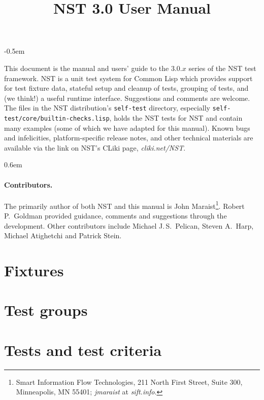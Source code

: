 \documentclass{article}
\title{NST 3.0 User Manual}
\begin{document}
\maketitle
\thispagestyle{empty}
\parskip -0.5em

\noindent This document is the manual and users' guide to the 3.0.$x$
series of the NST test framework.  NST is a unit test system for
Common Lisp which provides support for test fixture data, stateful
setup and cleanup of tests, grouping of tests, and (we think!) a
useful runtime interface.  Suggestions and comments are welcome.  The
files in the NST distribution's \texttt{self-test} directory,
especially \texttt{self-test/core/builtin-checks.lisp}, holds the NST
tests for NST and contain many examples (some of which we have adapted
for this manual).  Known bugs and infelicities, platform-specific
release notes, and other technical materials are available via the
link on NST's CLiki page, \textsl{cliki.net/NST}\enspace.

\tableofcontents
\parskip 0.6em
\parindent 0pt

\paragraph{Contributors.}
The primarily author of both NST and this manual is John
Maraist\footnote{Smart Information Flow Technologies, 211 North First
  Street, Suite 300, Minneapolis, MN 55401; \textsl{jmaraist} at
  \textsl{sift.info}.}.  Robert P.\ Goldman provided guidance,
comments and suggestions through the development.  Other contributors
include Michael J.\,S.\ Pelican, Steven A.\ Harp, Michael
Atighetchi and Patrick Stein.  \cleardoublepage
{}

\section{Fixtures}
\label{fixtures}



\section{Test groups}
\label{sec:groups}


\section{Tests and test criteria}
\label{sec:deftest}

\end{document}
